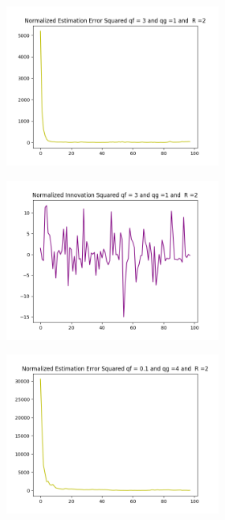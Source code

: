 \documentclass{article}
\begin{document}
        \begin{figure}[H]
            \centering 
            \begin{subfigure}{1\textwidth}  
                \begin{subfigure}{.5\textwidth}  
                    \centering 
                    \includegraphics[width=.5\linewidth]{./img/acc/nees3_qg1_r2.png}
                    \caption{}
                \end{subfigure}
                \begin{subfigure}{.5\textwidth}  
                    \centering                     
                    \includegraphics[width=.5\linewidth]{./img/acc/nis3_qg1_r2.png}
                    \caption{}
                \end{subfigure}
                \begin{subfigure}{.5\textwidth}  
                    \centering 
                    \includegraphics[width=.5\linewidth]{./img/acc/nees01_qg4_r2.png}
                    \caption{}
                \end{subfigure}

\end{subfigure}
\end{figure}
\end{document}
